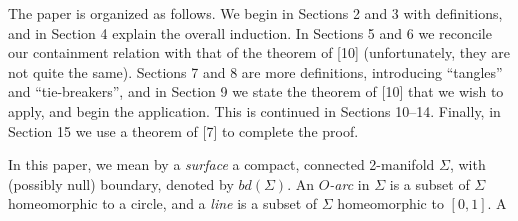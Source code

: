 The paper is organized as follows. We begin in Sections 2 and 3 with definitions, and in Section 4 explain the overall induction. In Sections 5 and 6 we reconcile our containment relation with that of the theorem of [10] (unfortunately, they are not quite the same). Sections 7 and 8 are more definitions, introducing ``tangles'' and ``tie-breakers'', and in Section 9 we state the theorem of [10] that we wish to apply, and begin the application. This is continued in Sections 10--14. Finally, in Section 15 we use a theorem of [7] to complete the proof.


In this paper, we mean by a \textit{surface} a compact, connected 2-manifold $\Sigma$, with (possibly null) boundary, denoted by $bd(\Sigma)$. An \textit{$O$-arc} in $\Sigma$ is a subset of $\Sigma$ homeomorphic to a circle, and a \textit{line} is a subset of $\Sigma$ homeomorphic to $[0, 1]$. A
